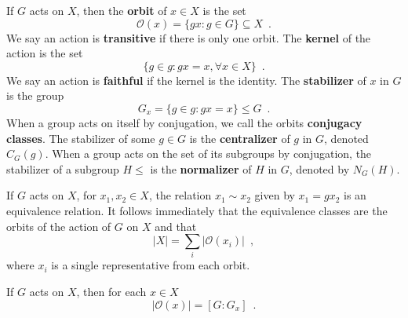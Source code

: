 \begin{definition}
	\cite[100]{Rotman1967}
	\cite[112]{DummitFoote2004}
	If $G$ acts on $X$, then the \textbf{orbit} of $x \in X$ is the set
	\begin{equation}
		\mathcal{O}(x) = \{ gx : g \in G \} \subseteq X \enspace.
	\end{equation}
	We say an action is \textbf{transitive} if there is only one orbit. The \textbf{kernel}
	of the action is the set
	\begin{equation}
		\{ g \in g : gx = x, \forall x \in X \} \enspace.
	\end{equation}
	We say an action is \textbf{faithful} if the kernel is the identity. The
	\textbf{stabilizer} of $x$ in $G$ is the group
	\begin{equation}
		G_x = \{ g \in g : gx = x \} \leq G \enspace.
	\end{equation}
	When a group acts on itself by conjugation, we call the orbits
	\textbf{conjugacy classes}. The stabilizer of some $g \in G$ is the
	\textbf{centralizer} of $g$ in $G$, denoted $C_G(g)$. When a group acts on the set of
	its subgroups by conjugation, the stabilizer of a subgroup $H \leq$ is the
	\textbf{normalizer} of $H$ in $G$, denoted by $N_G(H)$.
\end{definition}

\begin{proposition}
	\cite[102]{Rotman1967}
	\cite[114]{DummitFoote2004}
	\cite[250]{Tucker1974}
	If $G$ acts on $X$, for $x_1, x_2 \in X$, the relation $x_1 \sim x_2$ given by
	$x_1 = gx_2$ is an equivalence relation. It follows immediately that the equivalence
	classes are the orbits of the action of $G$ on $X$ and that
	\begin{equation}
		|X| = \sum_i |\mathcal{O}(x_i)| \enspace,
	\end{equation}
	where $x_i$ is a single representative from each orbit.
\end{proposition}

\begin{theorem}
	\cite[102]{Rotman1967}
	If $G$ acts on $X$, then for each $x \in X$
	\begin{equation}
		|\mathcal{O}(x)| = [G : G_x] \enspace.
	\end{equation}
\end{theorem}

